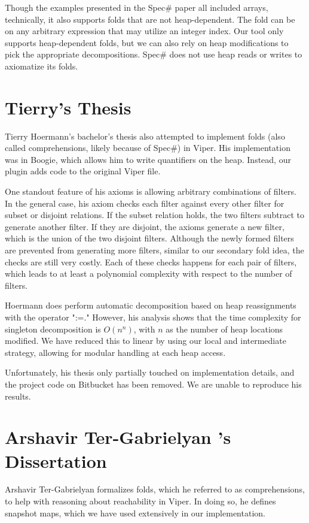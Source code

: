 \documentclass[msc,oneside]{ubcthesis}
\begin{document}
Though the examples presented in the Spec\# paper all included arrays, technically, it also supports folds that are not heap-dependent. The fold can be on any arbitrary expression that may utilize an integer index. Our tool only supports heap-dependent folds, but we can also rely on heap modifications to pick the appropriate decompositions. Spec\# does not use heap reads or writes to axiomatize its folds.

\section{Tierry's Thesis}
Tierry Hoermann's bachelor’s thesis also attempted to implement folds (also called comprehensions, likely because of Spec\#) in Viper. His implementation was in Boogie, which allows him to write quantifiers on the heap. Instead, our plugin adds code to the original Viper file. 

One standout feature of his axioms is allowing arbitrary combinations of filters. In the general case, his axiom checks each filter against every other filter for subset or disjoint relations. If the subset relation holds, the two filters subtract to generate another filter. If they are disjoint, the axioms generate a new filter, which is the union of the two disjoint filters. Although the newly formed filters are prevented from generating more filters, similar to our secondary fold idea, the checks are still very costly. Each of these checks happens for each pair of filters, which leads to at least a polynomial complexity with respect to the number of filters.

Hoermann does perform automatic decomposition based on heap reassignments with the operator ":=." However, his analysis shows that the time complexity for singleton decomposition is $O(n^n)$, with $n$ as the number of heap locations modified. We have reduced this to linear by using our local and intermediate strategy, allowing for modular handling at each heap access. 

Unfortunately, his thesis only partially touched on implementation details, and the project code on Bitbucket has been removed. We are unable to reproduce his results.

\section{Arshavir Ter-Gabrielyan 's Dissertation}
Arshavir Ter-Gabrielyan formalizes folds, which he referred to as comprehensions, to help with reasoning about reachability in Viper. In doing so, he defines snapshot maps, which we have used extensively in our implementation.
\end{document}
